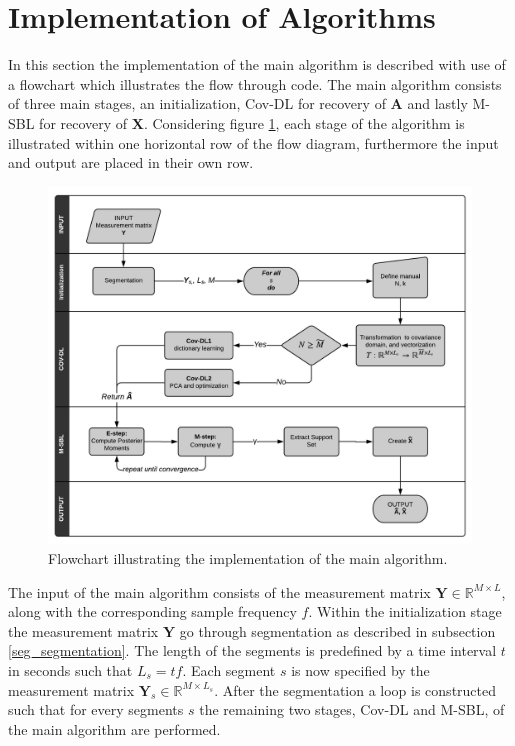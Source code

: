 \section{Implementation of Algorithms}\label{sec:implementation_flow}
In this section the implementation of the main algorithm is described with use of a flowchart which illustrates the flow through code.
The main algorithm consists of three main stages, an initialization, Cov-DL for recovery of $\mathbf{A}$ and lastly M-SBL for recovery of $\mathbf{X}$. 
Considering figure \ref{fig:flow}, each stage of the algorithm is illustrated within one horizontal row of the flow diagram, furthermore the input and output are placed in their own row.    
\begin{figure}[H]
\centering
\includegraphics[scale=0.9]{figures/ch_6/baseline_flowchart.png}
\caption{Flowchart illustrating the implementation of the main algorithm.}
\label{fig:flow}
\end{figure}
The input of the main algorithm consists of the measurement matrix $\mathbf{Y} \in \mathbb{R}^{M \times L}$, along with the corresponding sample frequency $f$. 
Within the initialization stage the measurement matrix $\mathbf{Y}$ go through segmentation as described in subsection \ref{seg_segmentation}. 
The length of the segments is predefined by a time interval $t$ in seconds such that $L_{s} = tf$. 
Each segment $s$ is now specified by the measurement matrix $\mathbf{Y}_s \in \mathbb{R}^{M \times L_{s}}$.
After the segmentation a loop is constructed such that for every segments $s$ the remaining two stages, Cov-DL and M-SBL, of the main algorithm are performed. 
